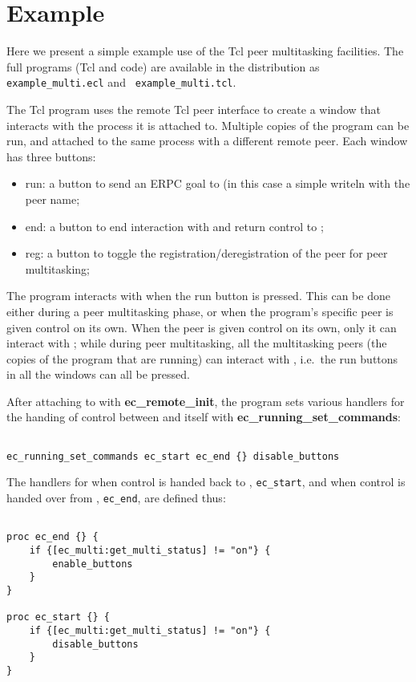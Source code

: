 \section{Example}

Here we present a simple example use of the Tcl peer multitasking
facilities. The full programs (Tcl and {\eclipse} code) are available in
the {\eclipse} distribution as {\tt example_multi.ecl} and {\tt
  example_multi.tcl}.


The Tcl program uses the remote Tcl peer interface to create a window that
interacts with the {\eclipse} process it is attached to. Multiple copies of
the program can be run, and attached to the same {\eclipse} process with a
different remote peer. Each window has three buttons:
\begin{itemize}
\item run: a button to send an ERPC goal to {\eclipse} (in this case a simple
  writeln with the peer name;
\item end: a button to end interaction with {\eclipse} and return control
  to {\eclipse};
\item reg: a button to toggle the registration/deregistration of the peer
  for peer multitasking;
\end{itemize}

The program interacts with {\eclipse} when the run button is pressed. This
can be done either during a peer multitasking phase, or when the program's specific
peer is given control on its own. When the peer is given control on its
own, only it can interact with {\eclipse}; while during peer multitasking,
all the multitasking peers (the copies of the program that are running) can
interact with {\eclipse}, i.e.\ the run buttons in all the windows can all
be pressed. 

After attaching to {\eclipse} with {\bf ec_remote_init}, the program sets
various handlers for the handing of control between {\eclipse} and itself
with {\bf ec_running_set_commands}: 

\begin{verbatim}

ec_running_set_commands ec_start ec_end {} disable_buttons

\end{verbatim}

The handlers for when control is handed back to {\eclipse}, {\tt ec_start},
and when control is handed over from {\eclipse}, {\tt ec_end}, are defined
thus: 

\begin{verbatim}

proc ec_end {} {
    if {[ec_multi:get_multi_status] != "on"} {
        enable_buttons
    }
}

proc ec_start {} {
    if {[ec_multi:get_multi_status] != "on"} {
        disable_buttons
    }
}

\end{verbatim}

